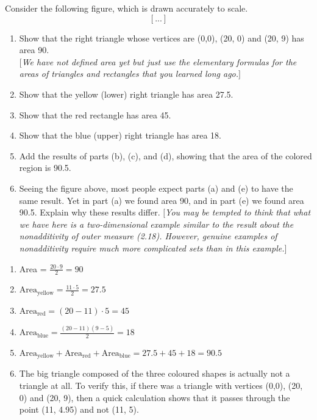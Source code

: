 \begin{exercise}
    Consider the following figure, which is drawn accurately to scale.
    $$[...]$$
    \begin{enumerate}[label = (\alph*)]
        \item Show that the right triangle whose vertices are (0,0), (20, 0) and (20, 9) has area 90.\\
        $[$\textit{We have not defined area yet but just use the elementary formulas for the areas of triangles and rectangles that you learned long ago.}$]$
        \item Show that the yellow (lower) right triangle has area 27.5.
        \item Show that the red rectangle has area 45.
        \item Show that the blue (upper) right triangle has area 18.
        \item Add the results of parts (b), (c), and (d), showing that the area of the colored region is 90.5.
        \item Seeing the figure above, most people expect parts (a) and (e) to have the same result. Yet in part (a) we found area 90, and in part (e) we found area 90.5. Explain why these results differ.
        $[$\textit{You may be tempted to think that what we have here is a two-dimensional example similar to the result about the nonadditivity of outer measure (2.18). However, genuine examples of nonadditivity require much more complicated sets than in this example.}$]$ \\
    \end{enumerate}
\end{exercise}

\begin{solution}
    \begin{enumerate}[label = (\alph*)]
        \item Area = $\frac{20 \cdot 9}{2} = 90$
        \item $\text{Area}_{\text{yellow}} = \frac{11\cdot 5}{2} = 27.5$
        \item $\text{Area}_{\text{red}} = (20 - 11)\cdot 5 = 45$
        \item $\text{Area}_{\text{blue}} = \frac{(20 - 11)(9 - 5)}{2} = 18$
        \item $\text{Area}_{\text{yellow}} + \text{Area}_{\text{red}} + \text{Area}_{\text{blue}} = 27.5 + 45 + 18 = 90.5$
        \item The big triangle composed of the three coloured shapes is actually not a triangle at all. To verify this, if there was a triangle with vertices (0,0), (20, 0) and (20, 9), then a quick calculation shows that it passes through the point (11, 4.95) and not (11, 5).
    \end{enumerate}
\end{solution}